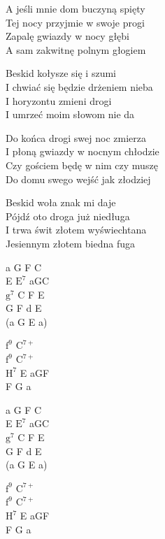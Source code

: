 
\begin{text}
    A jeśli mnie dom buczyną spięty\\
    Tej nocy przyjmie w swoje progi\\
    Zapalę gwiazdy w nocy głębi\\
    A sam zakwitnę polnym głogiem

    \hfill\break
    \vin Beskid kołysze się i szumi\\
    \vin I chwiać się będzie drżeniem nieba\\
    \vin I horyzontu zmieni drogi\\
    \vin I umrzeć moim słowom nie da

    Do końca drogi swej noc zmierza\\
    I płoną gwiazdy w nocnym chłodzie\\
    Czy gościem będę w nim czy muszę\\
    Do domu swego wejść jak złodziej

    \hfill\break
    \vin Beskid woła znak mi daje\\
    \vin Pójdź oto droga już niedługa\\
    \vin I trwa świt złotem wyświechtana\\
    \vin Jesiennym złotem biedna fuga
\end{text}
\begin{chord}
    a G F C\\
    E $\mathrm{E^7}$ aGC\\
    $\mathrm{g^7}$ C F E\\
    G F d E\\
    (a G E a)

    $\mathrm{f^9}$ $\mathrm{C^{7+}}$\\
    $\mathrm{f^9}$ $\mathrm{C^{7+}}$\\
    $\mathrm{H^7}$ E aGF\\
    F G a

    a G F C\\
    E $\mathrm{E^7}$ aGC\\
    $\mathrm{g^7}$ C F E\\
    G F d E\\
    (a G E a)

    $\mathrm{f^9}$ $\mathrm{C^{7+}}$\\
    $\mathrm{f^9}$ $\mathrm{C^{7+}}$\\
    $\mathrm{H^7}$ E aGF\\
    F G a
\end{chord}
